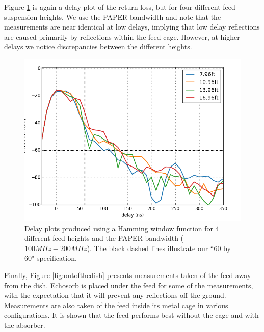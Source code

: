 \documentclass[12pt,preprint]{aastex}
\begin{document}
Figure \ref{fig:elevator} is again a delay plot of the return loss, but for
four different feed suspension heights. We use the PAPER bandwidth and note
that the measurements are near identical at low delays, implying that low delay
reflections are caused primarily by reflections within the feed cage. However,
at higher delays we notice discrepancies between the different heights.

\begin{figure}
\centering
\includegraphics[totalheight=0.4\textheight]{plots/delay_heights_paper.png}
\caption{Delay plots produced using a Hamming window function for 4 different feed heights and the PAPER bandwidth ($100MHz-200MHz$). The black dashed lines illustrate our ``60 by 60" specification.}
\label{fig:elevator}
\end{figure}

Finally, Figure \ref{fig:outofthedish} presents measurements taken of the feed
away from the dish. Echosorb is placed under the feed for some of the
measurements, with the expectation that it will prevent any reflections off the
ground. Measurements are also taken of the feed inside its metal cage in
various configurations. It is shown that the feed performs best without the cage and with the absorber. 
\end{document}
